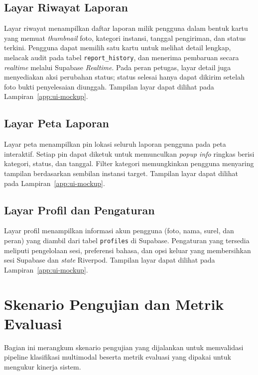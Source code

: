 \subsection{Layar Riwayat Laporan}

Layar riwayat menampilkan daftar laporan milik pengguna dalam bentuk kartu yang memuat \textit{thumbnail} foto, kategori instansi, tanggal pengiriman, dan status terkini. Pengguna dapat memilih satu kartu untuk melihat detail lengkap, melacak audit pada tabel \texttt{report\_history}, dan menerima pembaruan secara \textit{realtime} melalui Supabase \textit{Realtime}. Pada peran petugas, layar detail juga menyediakan aksi perubahan status; status selesai hanya dapat dikirim setelah foto bukti penyelesaian diunggah. Tampilan layar dapat dilihat pada Lampiran~\ref{app:ui-mockup}.

\subsection{Layar Peta Laporan}

Layar peta menampilkan pin lokasi seluruh laporan pengguna pada peta interaktif. Setiap pin dapat diketuk untuk memunculkan \textit{popup info} ringkas berisi kategori, status, dan tanggal. Filter kategori memungkinkan pengguna menyaring tampilan berdasarkan sembilan instansi target. Tampilan layar dapat dilihat pada Lampiran~\ref{app:ui-mockup}.

\subsection{Layar Profil dan Pengaturan}

Layar profil menampilkan informasi akun pengguna (foto, nama, surel, dan peran) yang diambil dari tabel \texttt{profiles} di Supabase. Pengaturan yang tersedia meliputi pengelolaan sesi, preferensi bahasa, dan opsi keluar yang membersihkan sesi Supabase dan \textit{state} Riverpod. Tampilan layar dapat dilihat pada Lampiran~\ref{app:ui-mockup}.

\section{Skenario Pengujian dan Metrik Evaluasi}
\label{sec:skenario-pengujian}

Bagian ini merangkum skenario pengujian yang dijalankan untuk memvalidasi pipeline klasifikasi multimodal beserta metrik evaluasi yang dipakai untuk mengukur kinerja sistem.

